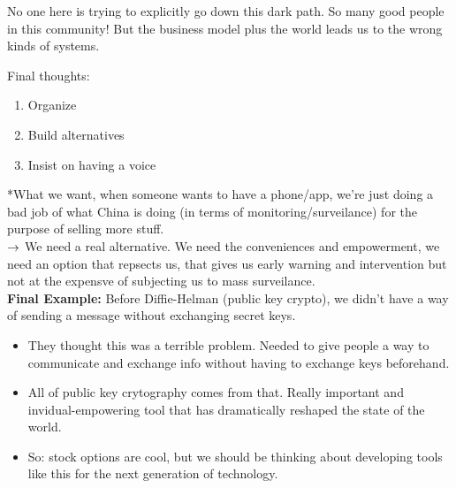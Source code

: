 No one here is trying to explicitly go down this dark path. So many good people in this community! But the business model plus the world leads us to the wrong kinds of systems.

Final thoughts:
\begin{enumerate}
    \item Organize
    \item Build alternatives
    \item Insist on having a voice
\end{enumerate}

*What we want, when someone wants to have a phone/app, we're just doing a bad job of what China is doing (in terms of monitoring/surveilance) for the purpose of selling more stuff. \\

$\rightarrow$ We need a real alternative. We need the conveniences and empowerment, we need an option that repsects us, that gives us early warning and intervention but not at the expensve of subjecting us to mass surveilance. \\

{\bf Final Example:} Before Diffie-Helman (public key crypto), we didn't have a way of sending a message without exchanging secret keys. 
\begin{itemize}
    \item They thought this was a terrible problem. Needed to give people a way to communicate and exchange info without having to exchange keys beforehand.
    
    \item All of public key crytography comes from that. Really important and invidual-empowering tool that has dramatically reshaped the state of the world.
    
    \item So: stock options are cool, but we should be thinking about developing tools like this for the next generation of technology.
\end{itemize}

